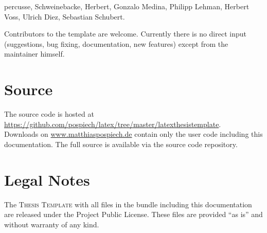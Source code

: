 percusse, %
Schweinebacke, %
Herbert, %
Gonzalo Medina, %
Philipp Lehman, %
Herbert Voss,
Ulrich Diez,
Sebastian Schubert.

Contributors to the template are welcome. Currently there is no direct input (suggestions, bug fixing, documentation, new features) except from the maintainer himself.

\section*{Source}
The source code is hosted at \\
\url{https://github.com/pospiech/latex/tree/master/latexthesistemplate}. \\
Downloads on \url{www.matthiaspospiech.de} contain only the user code including this documentation. The full source is available via the source code repository.

\section*{Legal Notes}
The \textsc{\latex Thesis Template} with all files in the bundle including this documentation are released under the \latex Project Public License. These files are provided “as is” and without warranty of any kind.

